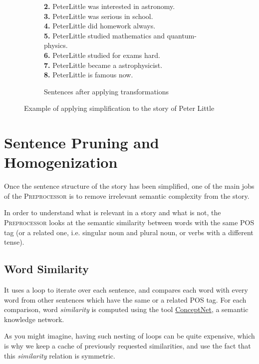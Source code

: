 \begin{figure}[H]
\begin{subfigure}{\textwidth}
\begin{displayquote}
\textbf{2.}  PeterLittle was interested in  astronomy.\\
\textbf{3.}  PeterLittle was serious in school.\\
\textbf{4.}  PeterLittle did  homework  always.\\
\textbf{5.}  PeterLittle studied mathematics and  quantum-physics.\\
\textbf{6.} PeterLittle studied for  exams hard.\\
\textbf{7.} PeterLittle became  a astrophysicist.\\
\textbf{8.} PeterLittle is famous  now.
\caption{Sentences after applying transformations}
\end{displayquote}
\end{subfigure}
\caption{Example of applying simplification to the story of Peter Little}
\label{fig:simplification_example}
\end{figure}

\section{Sentence Pruning and Homogenization}

Once the sentence structure of the story has been simplified, one of the main jobs of the \textsc{Preprocessor} is to remove irrelevant semantic complexity from the story.

In order to understand what is relevant in a story and what is not, the \textsc{Preprocessor} looks at the semantic similarity between words with the same POS tag (or a related one, i.e. singular noun and plural noun, or verbs with a different tense).

\subsection{Word Similarity}

It uses a loop to iterate over each sentence, and compares each word with every word from other sentences which have the same or a related POS tag. For each comparison, word \textit{similarity} is computed using the tool \href{http://www.conceptnet.io}{ConceptNet}, a semantic knowledge network.

As you might imagine, having such nesting of loops can be quite expensive, which is why we keep a cache of previously requested similarities, and use the fact that this \textit{similarity} relation is symmetric.

